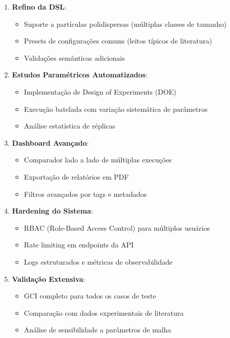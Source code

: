\begin{enumerate}
    \item \textbf{Refino da DSL}:
    \begin{itemize}
        \item Suporte a partículas polidispersas (múltiplas classes de tamanho)
        \item Presets de configurações comuns (leitos típicos de literatura)
        \item Validações semânticas adicionais
    \end{itemize}
    
    \item \textbf{Estudos Paramétricos Automatizados}:
    \begin{itemize}
        \item Implementação de Design of Experiments (DOE)
        \item Execução batelada com variação sistemática de parâmetros
        \item Análise estatística de réplicas
    \end{itemize}
    
    \item \textbf{Dashboard Avançado}:
    \begin{itemize}
        \item Comparador lado a lado de múltiplas execuções
        \item Exportação de relatórios em PDF
        \item Filtros avançados por tags e metadados
    \end{itemize}
    
    \item \textbf{Hardening do Sistema}:
    \begin{itemize}
        \item RBAC (Role-Based Access Control) para múltiplos usuários
        \item Rate limiting em endpoints da API
        \item Logs estruturados e métricas de observabilidade
    \end{itemize}
    
    \item \textbf{Validação Extensiva}:
    \begin{itemize}
        \item GCI completo para todos os casos de teste
        \item Comparação com dados experimentais de literatura
        \item Análise de sensibilidade a parâmetros de malha
    \end{itemize}
\end{enumerate}

